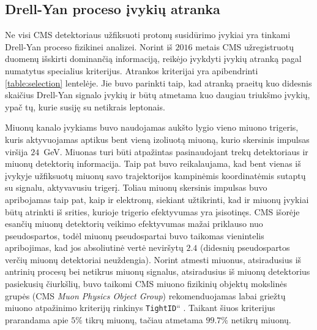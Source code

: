 \documentclass[a4paper, 12pt, oneside]{article}
\newcommand{\ttt}[1]{\texttt{#1}}
\newcommand{\ltq}[1]{{\quotedblbase{}#1\textquotedblleft{}}}
\newlength\q
\begin{document}
\subsection{Drell-Yan proceso įvykių atranka}\label{sec:selection}
Ne visi CMS detektoriaus užfiksuoti protonų susidūrimo įvykiai yra tinkami Drell-Yan proceso fizikinei analizei.
Norint iš $2016$ metais CMS užregistruotų duomenų išskirti dominančią informaciją, reikėjo įvykdyti įvykių atranką pagal
numatytus specialius kriterijus.
Atrankos kriterijai yra apibendrinti \ref{table:selection} lentelėje.
Jie buvo parinkti taip, kad atranką praeitų kuo didesnis skaičius Drell-Yan signalo įvykių ir būtų atmetama kuo daugiau
triukšmo įvykių, ypač tų, kurie susiję su netikrais leptonais.

Miuonų kanalo įvykiams buvo naudojamas aukšto lygio vieno miuono trigeris, kuris aktyvuojamas aptikus bent vieną izoliuotą
miuoną, kurio skersinis impulsas viršija $24$~GeV.
Miuonas turi būti atpažintas pasinaudojant trekų detektoriaus ir miuonų detektorių informacija.
Taip pat buvo reikalaujama, kad bent vienas iš įvykyje užfiksuotų miuonų savo trajektorijos kampinėmis koordinatėmis
sutaptų su signalu, aktyvavusiu trigerį.
Toliau miuonų skersinis impulsas buvo apribojamas taip pat, kaip ir elektronų, siekiant užtikrinti, kad ir miuonų įvykiai
būtų atrinkti iš srities, kurioje trigerio efektyvumas yra įsisotinęs.
CMS išorėje esančių miuonų detektorių veikimo efektyvumas mažai priklauso nuo pseudospartos, todėl miuonų pseudospartai
buvo taikomas vienintelis apribojimas, kad jos absoliutinė vertė neviršytų $2.4$ (didesnių pseudospartos verčių
miuonų detektoriai neuždengia).
Norint atmesti miuonus, atsiradusius iš antrinių procesų bei netikrus miuonų signalus, atsiradusius iš miuonų detektorius
pasiekusių čiurkšlių, buvo taikomi CMS miuono fizikinių objektų mokslinės grupės (CMS \textit{Muon Physics Object Group})
rekomenduojamas labai griežtų miuono atpažinimo kriterijų rinkinys \ltq{\ttt{TightID}} \cite{MuonID}.
Taikant šiuos kriterijus prarandama apie $5\%$ tikrų miuonų, tačiau atmetama $99.7\%$ netikrų miuonų.
\end{document}
